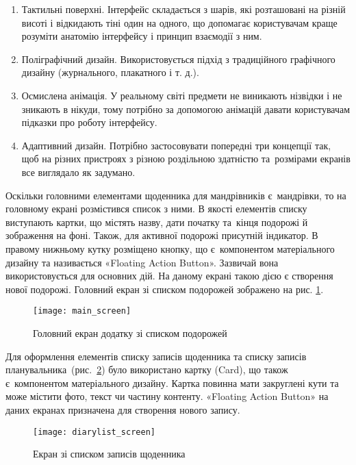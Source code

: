 \documentclass[../main.tex]{subfiles}
\begin{document}
\begin{enumerate}
	\item Тактильні поверхні. Інтерфейс складається з шарів, які розташовані на різній висоті і відкидають тіні один на одного, що допомагає користувачам краще розуміти анатомію інтерфейсу і принцип взаємодії з ним.
	\item Поліграфічний дизайн. Використовується підхід з традиційного графічного дизайну (журнального, плакатного і т. д.).
	\item Осмислена анімація. У реальному світі предмети не виникають нізвідки і не зникають в нікуди, тому потрібно за допомогою анімацій давати користувачам підказки про роботу інтерфейсу.
	\item Адаптивний дизайн. Потрібно застосовувати попередні три концепції так, щоб на різних пристроях з різною роздільною здатністю та~розмірами екранів все виглядало як задумано.
\end{enumerate}

Оскільки головними елементами щоденника для мандрівників є~мандрівки, то на головному екрані розмістився список з ними. В якості елементів списку виступають картки, що містять назву, дати початку та~кінця подорожі й зображення на фоні. Також, для активної подорожі присутній індикатор. В правому нижньому кутку розміщено кнопку, що є~компонентом матеріального дизайну та називається «Floating Action Button». Зазвичай вона використовується для основних дій. На даному екрані такою дією є створення нової подорожі. Головний екран зі списком подорожей зображено на рис. \ref{figure:main_screen}.

\begin{figure}[H]
	\centering
	\texttt{[image: main\_screen]}
	\caption{Головний екран додатку зі списком подорожей}
	\label{figure:main_screen}
\end{figure}

Для оформлення елементів списку записів щоденника та списку записів планувальника~(рис.~\ref{figure:diary_list_screen}) було використано картку (Card), що також є~компонентом матеріального дизайну. Картка повинна мати закруглені кути та може містити фото, текст чи частину контенту. «Floating Action Button» на даних екранах призначена для створення нового запису.

\begin{figure}[H]
	\centering
	\texttt{[image: diarylist\_screen]}
	\caption{Екран зі списком записів щоденника}
	\label{figure:diary_list_screen}
\end{figure}
\end{document}
